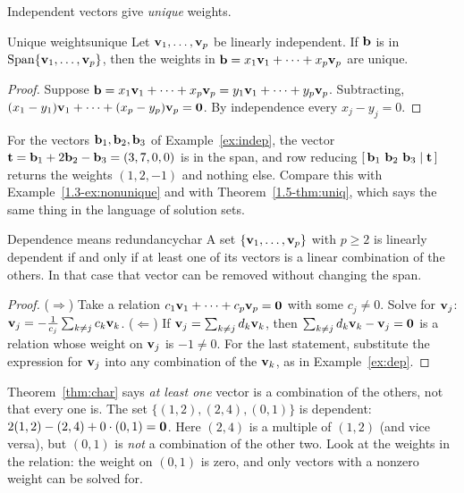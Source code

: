 \documentclass[11pt]{article}
\begin{document}
Independent vectors give \emph{unique} weights.

\begin{thm}{Unique weights}{unique}
Let $\mathbf{v}_1,\dots,\mathbf{v}_p$ be linearly independent. If $\mathbf{b}$ is in $\operatorname{Span}\{\mathbf{v}_1,\dots,\mathbf{v}_p\}$, then the weights in $\mathbf{b}=x_1\mathbf{v}_1+\cdots+x_p\mathbf{v}_p$ are unique.
\end{thm}

\begin{proof}
Suppose $\mathbf{b}=x_1\mathbf{v}_1+\cdots+x_p\mathbf{v}_p=y_1\mathbf{v}_1+\cdots+y_p\mathbf{v}_p$. Subtracting, $(x_1-y_1)\mathbf{v}_1+\cdots+(x_p-y_p)\mathbf{v}_p=\mathbf{0}$. By independence every $x_j-y_j=0$.
\end{proof}

For the vectors $\mathbf{b}_1,\mathbf{b}_2,\mathbf{b}_3$ of Example~\ref{ex:indep}, the vector $\mathbf{t}=\mathbf{b}_1+2\mathbf{b}_2-\mathbf{b}_3=(3,7,0,0)$ is in the span, and row reducing $[\,\bv{b}_1\ \bv{b}_2\ \bv{b}_3\mid\bv{t}\,]$ returns the weights $(1,2,-1)$ and nothing else. Compare this with Example~\ref{1.3-ex:nonunique} and with Theorem~\ref{1.5-thm:uniq}, which says the same thing in the language of solution sets.

\begin{thm}{Dependence means redundancy}{char}
A set $\{\mathbf{v}_1,\dots,\mathbf{v}_p\}$ with $p\ge2$ is linearly dependent if and only if at least one of its vectors is a linear combination of the others. In that case that vector can be removed without changing the span.
\end{thm}

\begin{proof}
($\Rightarrow$) Take a relation $c_1\mathbf{v}_1+\cdots+c_p\mathbf{v}_p=\mathbf{0}$ with some $c_j\neq0$. Solve for $\mathbf{v}_j$: $\mathbf{v}_j=-\tfrac{1}{c_j}\sum_{k\ne j}c_k\mathbf{v}_k$. ($\Leftarrow$) If $\mathbf{v}_j=\sum_{k\neq j}d_k\mathbf{v}_k$, then $\sum_{k\neq j}d_k\mathbf{v}_k-\mathbf{v}_j=\mathbf{0}$ is a relation whose weight on $\mathbf{v}_j$ is $-1\neq0$. For the last statement, substitute the expression for $\mathbf{v}_j$ into any combination of the $\mathbf{v}_k$, as in Example~\ref{ex:dep}.
\end{proof}

\begin{warn}
Theorem~\ref{thm:char} says \emph{at least one} vector is a combination of the others, not that every one is. The set $\{(1,2),(2,4),(0,1)\}$ is dependent: $2(1,2)-(2,4)+0\cdot(0,1)=\mathbf{0}$. Here $(2,4)$ is a multiple of $(1,2)$ (and vice versa), but $(0,1)$ is \emph{not} a combination of the other two. Look at the weights in the relation: the weight on $(0,1)$ is zero, and only vectors with a nonzero weight can be solved for.
\end{warn}
\end{document}
